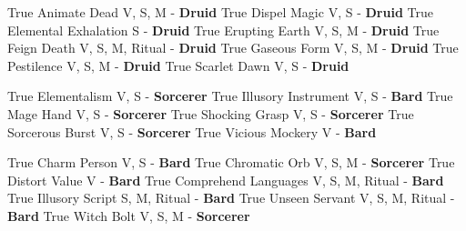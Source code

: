 \documentclass[letterpaper,openany,oneside,twocolumn]{book}
\begin{document}
	{True}
	{Animate Dead}
	{V, S, M - \textbf{Druid}}
	{True}
	{Dispel Magic}
	{V, S - \textbf{Druid}}
	{True}
	{Elemental Exhalation}
	{S - \textbf{Druid}}
	{True}
	{Erupting Earth}
	{V, S, M - \textbf{Druid}}
	{True}
	{Feign Death}
	{V, S, M, Ritual - \textbf{Druid}}
	{True}
	{Gaseous Form}
	{V, S, M - \textbf{Druid}}
	{True}
	{Pestilence}
	{V, S, M - \textbf{Druid}}
	{True}
	{Scarlet Dawn}
	{V, S - \textbf{Druid}}

\renderoldspellsheet

\ResetSpellSheetInput



	{True}
	{Elementalism}
	{V, S - \textbf{Sorcerer}}
	{True}
	{Illusory Instrument}
	{V, S - \textbf{Bard}}
	{True}
	{Mage Hand}
	{V, S - \textbf{Sorcerer}}
	{True}
	{Shocking Grasp}
	{V, S - \textbf{Sorcerer}}
	{True}
	{Sorcerous Burst}
	{V, S - \textbf{Sorcerer}}
	{True}
	{Vicious Mockery}
	{V - \textbf{Bard}}
	
	{True}
	{Charm Person}
	{V, S - \textbf{Bard}}
	{True}
	{Chromatic Orb}
	{V, S, M - \textbf{Sorcerer}}
	{True}
	{Distort Value}
	{V - \textbf{Bard}}
	{True}
	{Comprehend Languages}
	{V, S, M, Ritual - \textbf{Bard}}
	{True}
	{Illusory Script}
	{S, M, Ritual - \textbf{Bard}}
	{True}
	{Unseen Servant}
	{V, S, M, Ritual - \textbf{Bard}}
	{True}
	{Witch Bolt}
	{V, S, M - \textbf{Sorcerer}}


\renderoldspellsheet
\end{document}
